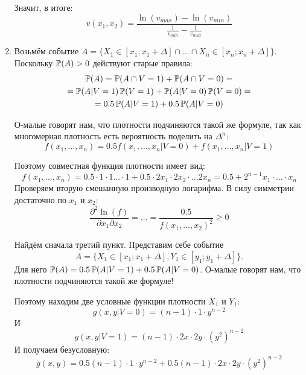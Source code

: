 \begin{enumerate}
Значит, в итоге:
\begin{equation}
v(x_{1},x_{2})=\frac{\ln(v_{max})-\ln(v_{min})}{\frac{1}{v_{min}}-\frac{1}{v_{max}}}
\end{equation}

\item Возьмём событие $ A=\{X_{1}\in[x_{1};x_{1}+\Delta] \cap \ldots \cap X_{n}\in[x_{n};x_{n}+\Delta]\} $. Поскольку $ \P(A)>0 $ действуют старые правила:
\begin{multline}
\P(A)=\P(A\cap V=1)+\P(A\cap V=0)=\\
=\P(A|V=1)\P(V=1)+\P(A|V=0)\P(V=0)=\\
=0.5\P(A|V=1)+0.5\P(A|V=0)
\end{multline}

О-малые говорят нам, что плотности подчиняются такой же формуле, так как многомерная плотность есть вероятность поделить на $ \Delta^{n} $:
\begin{equation}
f(x_{1},\ldots,x_{n})=0.5f(x_{1},\ldots,x_{n}|V=0)+f(x_{1},\ldots,x_{n}|V=1)
\end{equation}

Поэтому совместная функция плотности имеет вид:
\begin{equation}
f(x_{1},\ldots,x_{n})=0.5\cdot 1\cdot 1 \ldots\cdot 1+0.5\cdot 2x_{1}\cdot 2x_{2}\cdot \ldots 2x_{n}=0.5+2^{n-1}x_{1}\cdot \ldots \cdot x_{n}
\end{equation}
Проверяем вторую смешанную производную логарифма. В силу симметрии достаточно по $ x_{1} $ и $ x_{2} $:
\begin{equation}
\frac{\partial^{2}\ln(f)}{\partial x_{1}\partial x_{2}}=\ldots=\frac{0.5}{f(x_{1},\ldots,x_{2})^{2}}\geq 0
\end{equation}


Найдём сначала третий пункт. Представим себе событие
\[
A=\{X_{1}\in [x_{1};x_{1}+\Delta], Y_{1}\in[y_{1};y_{1}+\Delta]\}.
\]
Для него $ \P(A)= 0.5\P(A|V=1)+0.5\P(A|V=0)$. О-малые говорят нам, что плотности подчиняются такой же формуле!

Поэтому находим две условные функции плотности $ X_{1} $ и $ Y_{1} $:
\begin{equation}
g(x,y|V=0)=(n-1)\cdot 1 \cdot y^{n-2}
\end{equation}
И
\begin{equation}
g(x,y|V=1)=(n-1)\cdot 2x \cdot 2y \cdot (y^{2})^{n-2}
\end{equation}
И получаем безусловную:
\begin{equation}
g(x,y)=0.5(n-1)\cdot 1 \cdot y^{n-2}+0.5(n-1)\cdot 2x \cdot 2y \cdot (y^{2})^{n-2}
\end{equation}


\end{enumerate}
